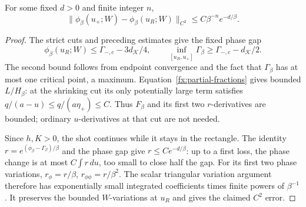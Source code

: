 \begin{lemma}\label{fx:lem-flat-part}
For some fixed \(d>0\) and finite integer \(n\),
\[
 \|\phi_\beta(u_+;W)-\phi_\beta(u_R;W)\|_{C^2}
          \le C\beta^{-n}e^{-d/\beta}.
\]
\end{lemma}
\begin{proof}
The strict cuts and preceding estimates give the fixed phase gap
\[
 \phi_\beta(u_R;W)\le\Gamma_{-,c}-3d_{\mathcal K}/4,\qquad
 \inf_{[u_R,u_+]}\Gamma_\beta\ge\Gamma_{-,c}-d_{\mathcal K}/2.
\]
The second bound follows from endpoint convergence and the fact that
\(\Gamma_\beta\) has at most one critical point, a maximum.
Equation~\eqref{fx:partial-fractions} gives bounded \(L/H_\beta\):
at the shrinking cut its only potentially large term satisfies
\(q/(a-u)\le q/(a\eta_+)\le C\). Thus \(F_\beta\) and its first
two \(r\)-derivatives are bounded; ordinary \(u\)-derivatives at
that cut are not needed.

Since \(h,K>0\), the shot continues while it stays in the rectangle.
The identity \(r=e^{(\phi_\beta-\Gamma_\beta)/\beta}\) and the phase
gap give \(r\le Ce^{-d/\beta}\): up to a first loss, the phase change
is at most \(C\int r\,du\), too small to close half the gap.
For its first two phase variations,
\(r_\phi=r/\beta\), \(r_{\phi\phi}=r/\beta^2\).
The scalar triangular variation argument therefore has exponentially
small integrated coefficients times finite powers of \(\beta^{-1}\).
It preserves the bounded \(W\)-variations at \(u_R\) and gives the
claimed \(C^2\) error.
\end{proof}

